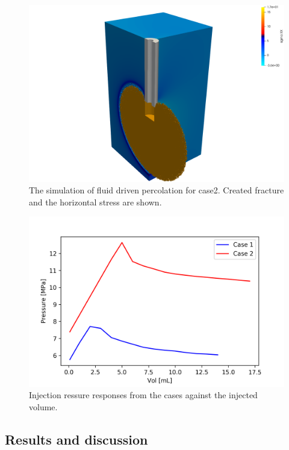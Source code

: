 \begin{figure}[!ht]
\includegraphics[width=1\textwidth]{figures/VPF_ME2_case2.png}
\caption{The simulation of fluid driven percolation for case2. Created fracture and the horizontal stress are shown.}
\label{fig:Keita_ME2_VPF_case2}
\end{figure}

\begin{figure}[!ht]
\includegraphics[width=1\textwidth]{figures/VPF_ME2_pres_vol.png}
\caption{Injection ressure responses from the cases against the injected volume.}
\label{fig:Keita_ME2_VPF_pres_vol}
\end{figure}

\subsection{Results and discussion}

